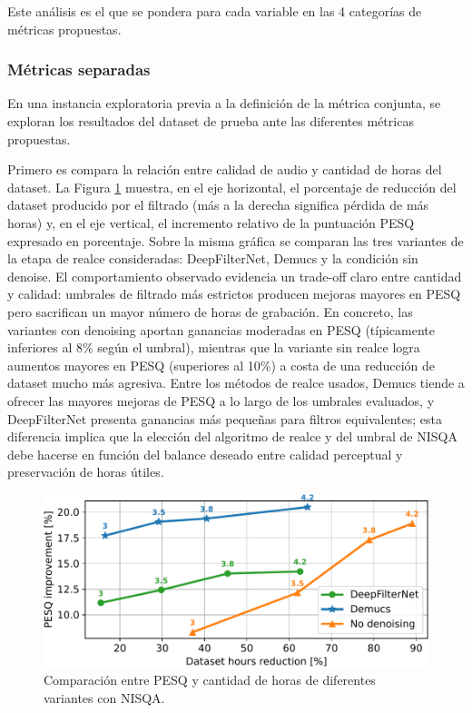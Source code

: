 Este análisis es el que se pondera para cada variable en las 4 categorías de métricas propuestas.

\subsubsection{Métricas separadas}
En una instancia exploratoria previa a la definición de la métrica conjunta, se exploran los resultados del dataset de prueba ante las diferentes métricas propuestas.

Primero es compara la relación entre calidad de audio y cantidad de horas del dataset. La Figura \ref{fig:horas_vs_pesq} muestra, en el eje horizontal, el porcentaje de reducción del dataset producido por el filtrado (más a la derecha significa pérdida de más horas) y, en el eje vertical, el incremento relativo de la puntuación PESQ expresado en porcentaje. Sobre la misma gráfica se comparan las tres variantes de la etapa de realce consideradas: DeepFilterNet, Demucs y la condición sin denoise. El comportamiento observado evidencia un trade-off claro entre cantidad y calidad: umbrales de filtrado más estrictos producen mejoras mayores en PESQ pero sacrifican un mayor número de horas de grabación. En concreto, las variantes con denoising aportan ganancias moderadas en PESQ (típicamente inferiores al 8\% según el umbral), mientras que la variante sin realce logra aumentos mayores en PESQ (superiores al 10\%) a costa de una reducción de dataset mucho más agresiva. Entre los métodos de realce usados, Demucs tiende a ofrecer las mayores mejoras de PESQ a lo largo de los umbrales evaluados, y DeepFilterNet presenta ganancias más pequeñas para filtros equivalentes; esta diferencia implica que la elección del algoritmo de realce y del umbral de NISQA debe hacerse en función del balance deseado entre calidad perceptual y preservación de horas útiles.

\begin{figure}[h]
  \centering
  \centerline{\includegraphics[width=12cm]{Figuras/Pipeline/pesq vs horas bien.pdf}}
  \caption{Comparación entre PESQ y cantidad de horas de diferentes variantes con NISQA.}
    \label{fig:horas_vs_pesq}
\end{figure}


